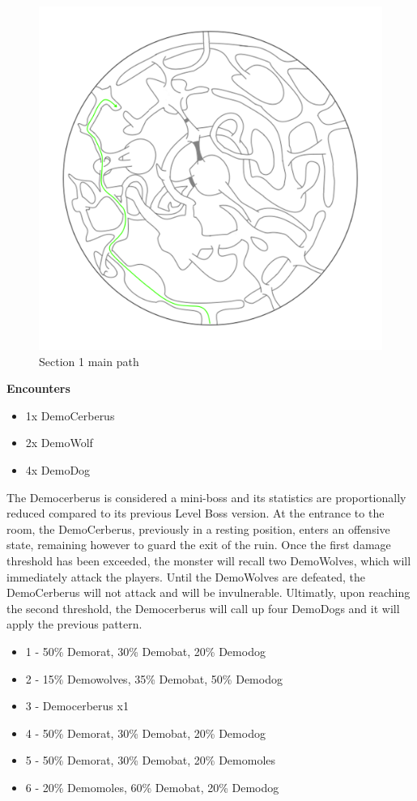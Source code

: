 \begin{figure}[H]
	\centering
	\includegraphics[width=0.7\linewidth]{images/map/map_principle_path_section_01.png}
	\caption*{Section 1 main path}
\end{figure}


\textbf{Encounters}
\begin{itemize}
	\item 1x DemoCerberus
	\item 2x DemoWolf
	\item 4x DemoDog
\end{itemize}
The Democerberus is considered a mini-boss and its statistics are proportionally reduced compared to its previous Level Boss version. At the entrance to the room, the DemoCerberus, previously in a resting position, enters an offensive state, remaining however to guard the exit of the ruin. Once the first damage threshold has been exceeded, the monster will recall two DemoWolves, which will immediately attack the players. Until the DemoWolves are defeated, the DemoCerberus will not attack and will be invulnerable. Ultimatly, upon reaching the second threshold, the Democerberus will call up four DemoDogs and it will apply the previous pattern.

\begin{itemize}
	\item 1 - 50\% Demorat, 30\% Demobat, 20\% Demodog
	\item 2 - 15\% Demowolves, 35\% Demobat, 50\% Demodog
	\item 3 - Democerberus x1
	\item 4 - 50\% Demorat, 30\% Demobat, 20\% Demodog
	\item 5 - 50\% Demorat, 30\% Demobat, 20\% Demomoles
	\item 6 - 20\% Demomoles, 60\% Demobat, 20\% Demodog
\end{itemize}

